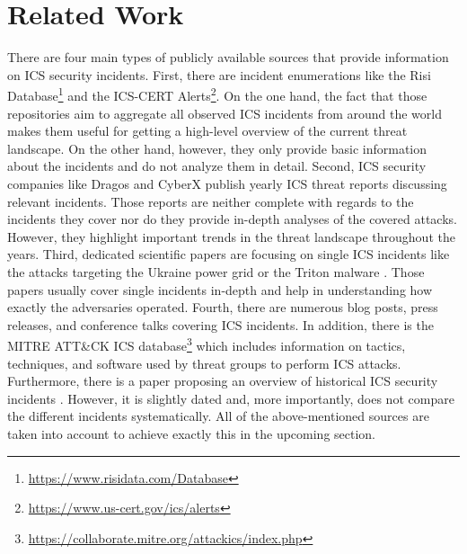 \documentclass[runningheads]{llncs}
\begin{document}
\section{Related Work}
\label{section:related-work}
There are four main types of publicly available sources that provide information on ICS security incidents.
First, there are incident enumerations like the Risi Database\footnote{\url{https://www.risidata.com/Database}} and the ICS-CERT Alerts\footnote{\url{https://www.us-cert.gov/ics/alerts}}.
On the one hand, the fact that those repositories aim to aggregate all observed ICS incidents from around the world makes them useful for getting a high-level overview of the current threat landscape.
On the other hand, however, they only provide basic information about the incidents and do not analyze them in detail.
Second, ICS security companies like Dragos \cite{dragos.19} and CyberX \cite{cyberx.19} publish yearly ICS threat reports discussing relevant incidents.
Those reports are neither complete with regards to the incidents they cover nor do they provide in-depth analyses of the covered attacks.
However, they highlight important trends in the threat landscape throughout the years.
Third, dedicated scientific papers are focusing on single ICS incidents like the attacks targeting the Ukraine power grid \cite{eisac.16} or the Triton malware \cite{pinto.18}. Those papers usually cover single incidents in-depth and help in understanding how exactly the adversaries operated.
Fourth, there are numerous blog posts, press releases, and conference talks covering ICS incidents.
In addition, there is the MITRE ATT\&CK ICS database\footnote{\url{https://collaborate.mitre.org/attackics/index.php}} which includes information on tactics, techniques, and software used by threat groups to perform ICS attacks.
Furthermore, there is a paper proposing an overview of historical ICS security incidents \cite{hemsley.18}.
However, it is slightly dated and, more importantly, does not compare the different incidents systematically.
All of the above-mentioned sources are taken into account to achieve exactly this in the upcoming section.
\end{document}
